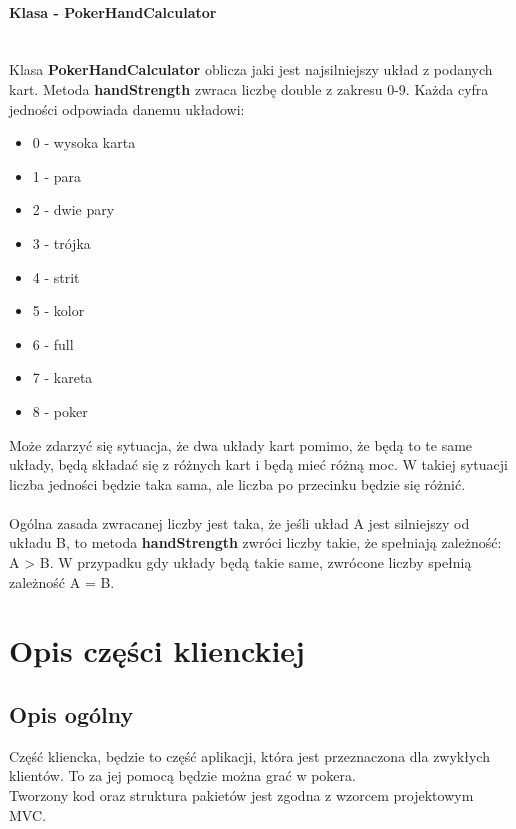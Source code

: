 \documentclass{article}
\newcommand{\mparagraph}[1]{\paragraph{#1}\mbox{}\vspace{2mm}\\}
\begin{document}
            \mparagraph{Klasa - PokerHandCalculator}
                Klasa \textbf{PokerHandCalculator} oblicza jaki jest najsilniejszy układ z podanych kart.
                Metoda \textbf{handStrength} zwraca liczbę double z zakresu 0-9.
                Każda cyfra jedności odpowiada danemu układowi:
                \begin{itemize}
                    \item 0 - wysoka karta
                    \item 1 - para
                    \item 2 - dwie pary
                    \item 3 - trójka
                    \item 4 - strit
                    \item 5 - kolor
                    \item 6 - full
                    \item 7 - kareta
                    \item 8 - poker
                \end{itemize}
                Może zdarzyć się sytuacja, że dwa układy kart pomimo, że będą to te same układy, będą składać się z różnych kart i będą mieć różną moc. W takiej sytuacji liczba jedności będzie taka sama, ale liczba po przecinku będzie się różnić.
                \\\\
                Ogólna zasada zwracanej liczby jest taka, że jeśli układ A jest silniejszy od układu B, to metoda \textbf{handStrength} zwróci liczby takie, że spełniają zależność: A > B.
                W przypadku gdy układy będą takie same, zwrócone liczby spełnią zależność A = B.

\section{Opis części klienckiej}
    \subsection{Opis ogólny}
        Część kliencka, będzie to część aplikacji, która jest przeznaczona dla zwykłych klientów.
        To za jej pomocą będzie można grać w pokera.
        \\
        Tworzony kod oraz struktura pakietów jest zgodna z wzorcem projektowym MVC.
    
\end{document}
